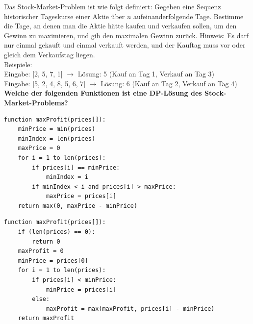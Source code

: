 \begin{contentbox}
Das Stock-Market-Problem ist wie folgt definiert: Gegeben eine Sequenz historischer Tageskurse einer Aktie über $n$ aufeinanderfolgende Tage. Bestimme die Tage, an denen man die Aktie hätte kaufen und verkaufen sollen, um den Gewinn zu maximieren, und gib den maximalen Gewinn zurück.
Hinweis: Es darf nur einmal gekauft und einmal verkauft werden, und der Kauftag muss vor oder gleich dem Verkaufstag liegen. \\
Beispiele: \\
Eingabe: [2, 5, 7, 1] $\rightarrow$ Lösung: 5 (Kauf an Tag 1, Verkauf an Tag 3)\\
Eingabe: [5, 2, 4, 8, 5, 6, 7] $\rightarrow$ Lösung: 6 (Kauf an Tag 2, Verkauf an Tag 4)\\
\textbf{Welche der folgenden Funktionen ist eine DP-Lösung des Stock-Market-Problems?}
\end{contentbox}
\begin{codebox}
\begin{lstlisting}[style=CodeExpert]
function maxProfit(prices[]):
    minPrice = min(prices)
    minIndex = len(prices)
    maxPrice = 0
    for i = 1 to len(prices):
        if prices[i] == minPrice:
            minIndex = i
        if minIndex < i and prices[i] > maxPrice:
            maxPrice = prices[i]
    return max(0, maxPrice - minPrice)
\end{lstlisting}
\end{codebox}
\begin{codebox}
\begin{lstlisting}[style=CodeExpert]
function maxProfit(prices[]):
    if (len(prices) == 0):
        return 0
    maxProfit = 0
    minPrice = prices[0]
    for i = 1 to len(prices):
        if prices[i] < minPrice:
            minPrice = prices[i]
        else:
            maxProfit = max(maxProfit, prices[i] - minPrice)
    return maxProfit
\end{lstlisting}
\end{codebox}

